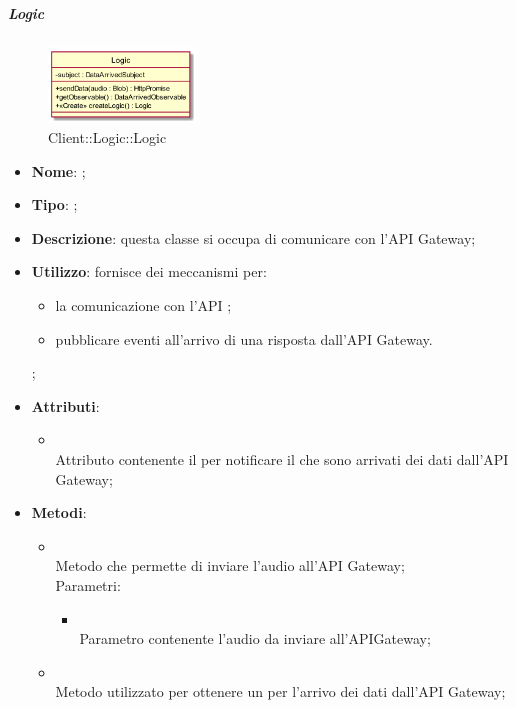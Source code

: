 \hypertarget{Logic_label}{\subparagraph{Logic}}
\begin{figure}[h]
	\centering
	\includegraphics[width=0.35\textwidth,height=\textheight,keepaspectratio]{images/ClassLogic.png}
	\caption{Client::Logic::Logic}
\end{figure}
\begin{itemize}
	\item \textbf{Nome}: ;
	\item \textbf{Tipo}: ;
	\item \textbf{Descrizione}: questa classe si occupa di comunicare con l'API Gateway;
	\item \textbf{Utilizzo}: fornisce dei meccanismi per:
	\begin{itemize}
		\item la comunicazione con l'API ;
		\item pubblicare eventi all'arrivo di una risposta dall'API Gateway.
	\end{itemize};
	\item \textbf{Attributi}:
	\begin{itemize}
		\item[]  \\
		Attributo contenente il  per notificare il  che sono arrivati dei dati dall'API Gateway;
	\end{itemize}
	\item \textbf{Metodi}:
	\begin{itemize}
		\item[]  \\		Metodo che permette di inviare l'audio all'API Gateway;\\
		Parametri:
		\begin{itemize}
			\item {} \\
			Parametro contenente l'audio da inviare all'APIGateway;
		\end{itemize}
		\item[]  \\		Metodo utilizzato per ottenere un  per l'arrivo dei dati dall'API Gateway;\\

\end{itemize}
\end{itemize}
